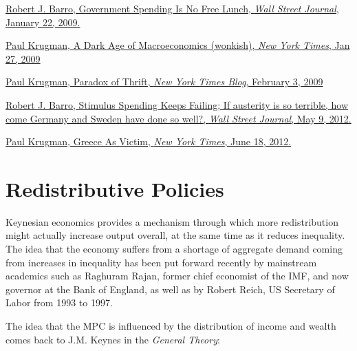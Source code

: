 \documentclass[]{book}
\theoremstyle{definition}
\theoremstyle{definition}
\theoremstyle{definition}
\theoremstyle{remark}
\begin{document}
\href{https://search.proquest.com/docview/399114897/CBD1D9A468D04A85PQ/2?accountid=14512}{Robert
J. Barro, Government Spending Is No Free Lunch, \emph{Wall Street
Journal}, January 22, 2009.}

\href{https://search.proquest.com/docview/1930920374/1A771BC8177A4FB7PQ/1?accountid=14512}{Paul
Krugman, A Dark Age of Macroeconomics (wonkish), \emph{New York Times},
Jan 27, 2009}

\href{https://search.proquest.com/docview/1930919033/3BCD850F469341AFPQ/1?accountid=14512}{Paul
Krugman, Paradox of Thrift, \emph{New York Times Blog}, February 3,
2009}

\href{https://search.proquest.com/nytimes/docview/1012047079/226EC4F8D3A49B0PQ/1?accountid=14512}{Robert
J. Barro, Stimulus Spending Keeps Failing; If austerity is so terrible,
how come Germany and Sweden have done so well?, \emph{Wall Street
Journal}, May 9, 2012.}

\href{https://search.proquest.com/docview/1020817739/fulltext/91FC1D36882C4B64PQ/1?accountid=14512}{Paul
Krugman, Greece As Victim, \emph{New York Times}, June 18, 2012.}

\hypertarget{redistributive}{\chapter{Redistributive
Policies}\label{redistributive}}

Keynesian economics provides a mechanism through which more
redistribution might actually increase output overall, at the same time
as it reduces inequality. The idea that the economy suffers from a
shortage of aggregate demand coming from increases in inequality has
been put forward recently by mainstream academics such as Raghuram
Rajan, former chief economist of the IMF, and now governor at the Bank
of England, as well as by Robert Reich, US Secretary of Labor from 1993
to 1997.

The idea that the MPC is influenced by the distribution of income and
wealth comes back to J.M. Keynes in the \emph{General Theory}:
\end{document}

